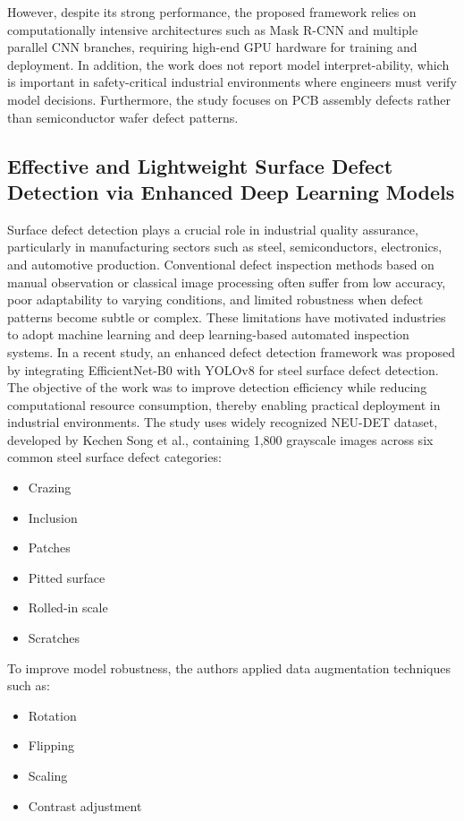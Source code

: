 However, despite its strong performance, the proposed framework relies on computationally intensive architectures such as Mask R-CNN and multiple parallel CNN branches, requiring high-end GPU hardware for training and deployment. In addition, the work does not report model interpret-ability, which is important in safety-critical industrial environments where engineers must verify model decisions. Furthermore, the study focuses on PCB assembly defects rather than semiconductor wafer defect patterns.

\subsection{Effective and Lightweight Surface Defect Detection via Enhanced Deep Learning Models}
Surface defect detection plays a crucial role in industrial quality assurance, particularly in manufacturing sectors such as steel, semiconductors, electronics, and automotive production. Conventional defect inspection methods based on manual observation or classical image processing often suffer from low accuracy, poor adaptability to varying conditions, and limited robustness when defect patterns become subtle or complex. These limitations have motivated industries to adopt machine learning and deep learning-based automated inspection systems.
In a recent study, an enhanced defect detection framework was proposed by integrating EfficientNet-B0 with YOLOv8 for steel surface defect detection. The objective of the work was to improve detection efficiency while reducing computational resource consumption, thereby enabling practical deployment in industrial environments.
The study uses widely recognized NEU-DET dataset, developed by Kechen Song et al., containing 1,800 grayscale images across six common steel surface defect categories:
\begin{itemize}
\item Crazing
\item Inclusion
\item Patches
\item Pitted surface
\item Rolled-in scale
\item Scratches
\end{itemize}

To improve model robustness, the authors applied data augmentation techniques such as:
\begin{itemize}
\item Rotation
\item Flipping
\item Scaling
 \item Contrast adjustment
\end{itemize}

